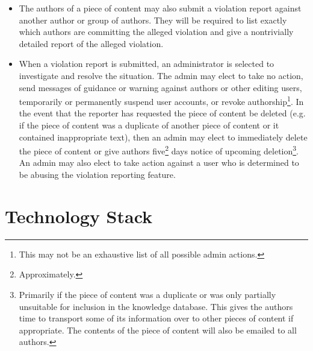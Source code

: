 \documentclass[12pt,letterpaper]{article}
\begin{document}
\begin{enumerate}
\begin{itemize}
\item The authors of a piece of content may also submit a violation report against another author or group of authors. They will be required to list exactly which authors are committing the alleged violation and give a nontrivially detailed report of the alleged violation.
\item When a violation report is submitted, an administrator is selected to investigate and resolve the situation. The admin may elect to take no action, send messages of guidance or warning against authors or other editing users, temporarily or permanently suspend user accounts, or revoke authorship\footnote{This may not be an exhaustive list of all possible admin actions.}. In the event that the reporter has requested the piece of content be deleted (e.g. if the piece of content was a duplicate of another piece of content or it contained inappropriate text), then an admin may elect to immediately delete the piece of content or give authors five\footnote{Approximately.} days notice of upcoming deletion\footnote{Primarily if the piece of content was a duplicate or was only partially unsuitable for inclusion in the knowledge database. This gives the authors time to transport some of its information over to other pieces of content if appropriate. The contents of the piece of content will also be emailed to all authors.}. An admin may also elect to take action against a user who is determined to be abusing the violation reporting feature.
\end{itemize}
\end{enumerate}




\section{Technology Stack}
\end{document}
